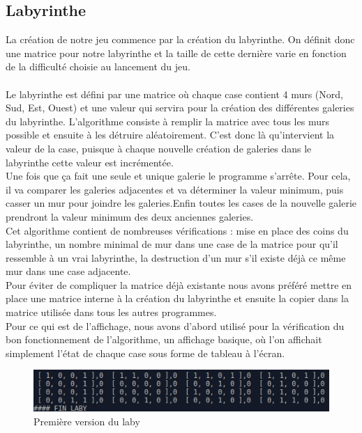 \documentclass[12pt,a4paper,twoside]{article}
\begin{document}
\subsection{Labyrinthe}
La création de notre jeu commence par la création du labyrinthe. On définit donc une matrice pour notre labyrinthe et la taille de cette dernière varie en fonction de la difficulté choisie au lancement du jeu.
\\
\\
Le labyrinthe est défini par une matrice où chaque case contient 4 murs (Nord, Sud, Est, Ouest) et une valeur qui servira pour la création des différentes galeries du labyrinthe. L’algorithme consiste à remplir la matrice avec tous les murs possible et ensuite à les détruire aléatoirement. C’est donc là qu’intervient la valeur de la case, puisque à chaque nouvelle création de galeries dans le labyrinthe cette valeur est incrémentée. 
\\Une fois que ça fait une seule et unique galerie le programme s’arrête. Pour cela, il va comparer les galeries adjacentes et va déterminer la valeur minimum, puis casser un mur pour joindre les galeries.Enfin toutes les cases de la nouvelle galerie prendront la valeur minimum des deux anciennes galeries.\\
Cet algorithme contient de nombreuses vérifications : mise en place des coins du labyrinthe, un nombre minimal de mur dans une case de la matrice pour qu’il ressemble à un vrai labyrinthe, la destruction d’un mur s’il existe déjà ce même mur dans une case adjacente. 
\\Pour éviter de compliquer la matrice déjà existante nous avons préféré mettre en place une matrice interne à la création du labyrinthe et ensuite la copier dans la matrice utilisée dans tous les autres programmes.\\
Pour ce qui est de l’affichage, nous avons d’abord utilisé pour la vérification du bon fonctionnement de l’algorithme, un affichage basique, où l’on affichait simplement l’état de chaque case sous forme de tableau à l’écran.\\
\begin{figure}[h]
\centering
\includegraphics[width=1\textwidth]{IMG/laby_prem.png}
\caption{Première version du laby}
\end{figure}
\\
\end{document}
